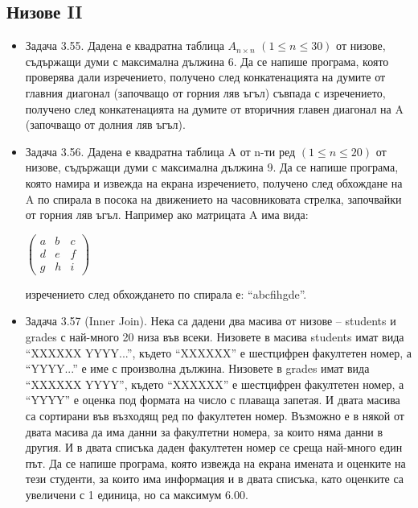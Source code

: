 {\subsection {Низове II}

\begin{itemize}[resume]

  \item Задача 3.55. \cite{sbornik} Дадена е квадратна таблица $A_{n\times n}$ $(1 \le n \le 30)$ от низове, съдържащи думи с максимална дължина 6. Да се напише програма, която проверява дали изречението, получено след конкатенацията на думите от главния диагонал (започващо от горния ляв ъгъл) съвпада с изречението, получено след конкатенацията на думите от вторичния главен диагонал на A (започващо от долния ляв ъгъл).

  \item Задача 3.56. \cite{sbornik} Дадена е квадратна таблица A от n-ти ред $(1 \le n \le 20)$ от низове, съдържащи думи с максимална дължина 9. Да се напише програма, която намира и извежда на екрана изречението, получено след обхождане на A по спирала в посока на движението на часовниковата стрелка, започвайки от горния ляв ъгъл. Например ако матрицата A има вида:

  $\left( \begin{array}{ccc}
  a & b & c \\
  d & e & f \\
  g & h & i
  \end{array} \right)$

  изречението след обхождането по спирала е: ``abcfihgde''.

  \item Задача 3.57 (Inner Join). \cite{sbornik} Нека са дадени два масива от низове – students и grades с най-много 20 низа във всеки. Низовете в масива students имат вида ``XXXXXX YYYY...'', където ``XXXXXX'' е шестцифрен факултетен номер, а ``YYYY...'' е име с произволна дължина. Низовете в grades имат вида ``XXXXXX YYYY'', където ``XXXXXX'' е шестцифрен факултетен номер, а ``YYYY'' е оценка под формата на число с плаваща запетая. И двата масива са сортирани във възходящ ред по факултетен номер. Възможно е в някой от двата масива да има данни за факултетни номера, за които няма данни в другия. И в двата списъка даден факултетен номер се среща най-много един път. Да се напише програма, която извежда на екрана имената и оценките на тези студенти, за които има информация и в двата списъка, като оценките са увеличени с 1 единица, но са максимум 6.00.


\end{itemize}}
